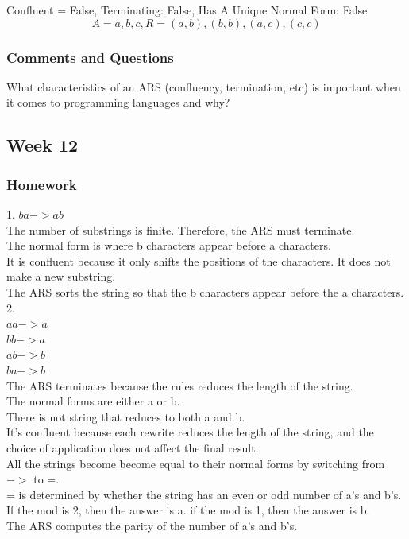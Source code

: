\documentclass{article}
\theoremstyle{theorem}
\theoremstyle{definition}
\theoremstyle{remark}
\begin{document}
Confluent = False, Terminating: False, Has A Unique Normal Form: False\\
\[A={a,b,c}, R={(a,b),(b,b),(a,c),(c,c)}\]

\subsubsection*{Comments and Questions}
What characteristics of an ARS (confluency, termination, etc) is important when it comes to programming languages and why?

\subsection{Week 12}
\subsubsection*{Homework}
1. $ba -> ab$ \\
The number of substrings is finite. Therefore, the ARS must terminate. \\
The normal form is where b characters appear before a characters. \\
It is confluent because it only shifts the positions of the characters. It does not make a new substring. \\
The ARS sorts the string so that the b characters appear before the a characters. \\
2. \\
$aa -> a$ \\
$bb -> a$\\
$ab -> b$ \\
$ba -> b$ \\
The ARS terminates because the rules reduces the length of the string. \\
The normal forms are either a or b. \\
There is not string that reduces to both a and b. \\
It's confluent because each rewrite reduces the length of the string, and the choice of application does not affect the final result. \\
All the strings become become equal to their normal forms by switching from $->$ to =. \\
= is determined by whether the string has an even or odd number of a's and b's.\\
If the mod is 2, then the answer is a. if the mod is 1, then the answer is b. \\
The ARS computes the parity of the number of a's and b's. \\
\end{document}
